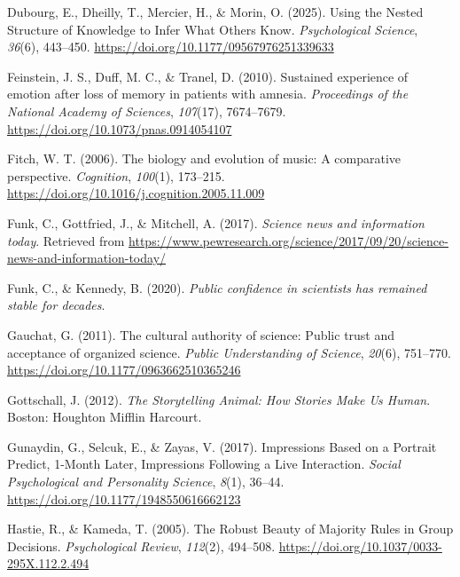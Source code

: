 \documentclass[
  english,
  doc,floatsintext]{apa6}
\newlength{\cslhangindent}
\newenvironment{CSLReferences}[2] %
 {\begin{list}{}{%
  \setlength{\itemindent}{0pt}
  \setlength{\leftmargin}{0pt}
  \setlength{\parsep}{0pt}
  \ifodd #1
   \setlength{\leftmargin}{\cslhangindent}
   \setlength{\itemindent}{-1\cslhangindent}
  \fi
  \setlength{\itemsep}{#2\baselineskip}}}
 {\end{list}}
\begin{document}
\begin{CSLReferences}{1}{0}
Dubourg, E., Dheilly, T., Mercier, H., \& Morin, O. (2025). Using the Nested Structure of Knowledge to Infer What Others Know. \emph{Psychological Science}, \emph{36}(6), 443--450. \url{https://doi.org/10.1177/09567976251339633}

Feinstein, J. S., Duff, M. C., \& Tranel, D. (2010). Sustained experience of emotion after loss of memory in patients with amnesia. \emph{Proceedings of the National Academy of Sciences}, \emph{107}(17), 7674--7679. \url{https://doi.org/10.1073/pnas.0914054107}

Fitch, W. T. (2006). The biology and evolution of music: A comparative perspective. \emph{Cognition}, \emph{100}(1), 173--215. \url{https://doi.org/10.1016/j.cognition.2005.11.009}

Funk, C., Gottfried, J., \& Mitchell, A. (2017). \emph{Science news and information today}. Retrieved from \url{https://www.pewresearch.org/science/2017/09/20/science-news-and-information-today/}

Funk, C., \& Kennedy, B. (2020). \emph{Public confidence in scientists has remained stable for decades}.

Gauchat, G. (2011). The cultural authority of science: Public trust and acceptance of organized science. \emph{Public Understanding of Science}, \emph{20}(6), 751--770. \url{https://doi.org/10.1177/0963662510365246}

Gottschall, J. (2012). \emph{The Storytelling Animal: How Stories Make Us Human}. Boston: Houghton Mifflin Harcourt.

Gunaydin, G., Selcuk, E., \& Zayas, V. (2017). Impressions Based on a Portrait Predict, 1-Month Later, Impressions Following a Live Interaction. \emph{Social Psychological and Personality Science}, \emph{8}(1), 36--44. \url{https://doi.org/10.1177/1948550616662123}

Hastie, R., \& Kameda, T. (2005). The Robust Beauty of Majority Rules in Group Decisions. \emph{Psychological Review}, \emph{112}(2), 494--508. \url{https://doi.org/10.1037/0033-295X.112.2.494}


\end{CSLReferences}
\end{document}
